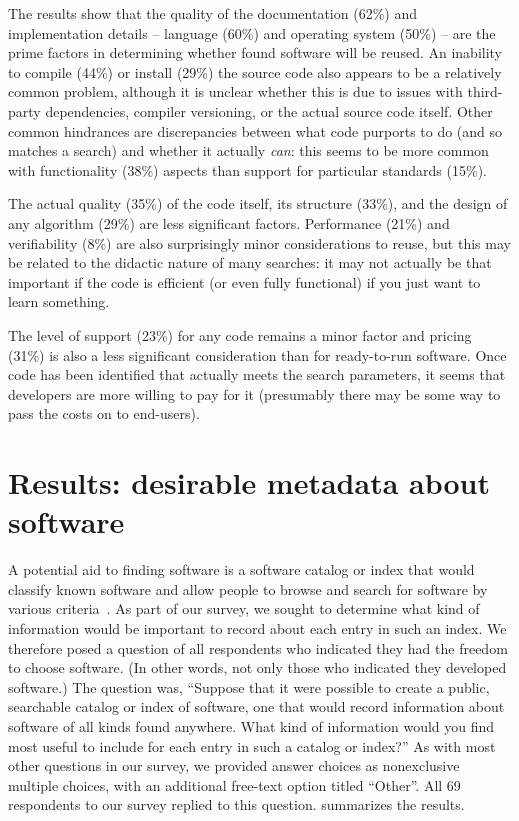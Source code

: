 \documentclass{casicswhitepaper}
\newcommand{\totalrespondents}{69\xspace}
\begin{document}
The results show that the quality of the documentation (62\%) and implementation details -- language (60\%) and operating system (50\%) -- are the prime factors in determining whether found software will be reused. An inability to compile (44\%) or install (29\%) the source code also appears to be a relatively common problem, although it is unclear whether this is due to issues with third-party dependencies, compiler versioning, or the actual source code itself.  Other common hindrances are discrepancies between what code purports to do (and so matches a search) and whether it actually \emph{can}: this seems to be more common with functionality (38\%) aspects than support for particular standards (15\%).

The actual quality (35\%) of the code itself, its structure (33\%), and the design of any algorithm (29\%) are less significant factors. Performance (21\%) and verifiability (8\%) are also surprisingly minor considerations to reuse, but this may be related to the didactic nature of many searches: it may not actually be that important if the code is efficient (or even fully functional) if you just want to learn something.

The level of support (23\%) for any code remains a minor factor and pricing (31\%) is also a less significant consideration than for ready-to-run software. Once code has been identified that actually meets the search parameters, it seems that developers are more willing to pay for it (presumably there may be some way to pass the costs on to end-users).


\section{Results: desirable metadata about software}

A potential aid to finding software is a software catalog or index that would classify known software and allow people to browse and search for software by various criteria~\cite{marshall2006software}.  As part of our survey, we sought to determine what kind of information would be important to record about each entry in such an index.  We therefore posed a question of all respondents who indicated they had the freedom to choose software.  (In other words, not only those who indicated they developed software.)  The question was, ``Suppose that it were possible to create a public, searchable catalog or index of software, one that would record information about software of all kinds found anywhere.  What kind of information would you find most useful to include for each entry in such a catalog or index?''  As with most other questions in our survey, we provided answer choices as nonexclusive multiple choices, with an additional free-text option titled ``Other''.  All \totalrespondents respondents to our survey replied to this question.   summarizes the results.
\end{document}
